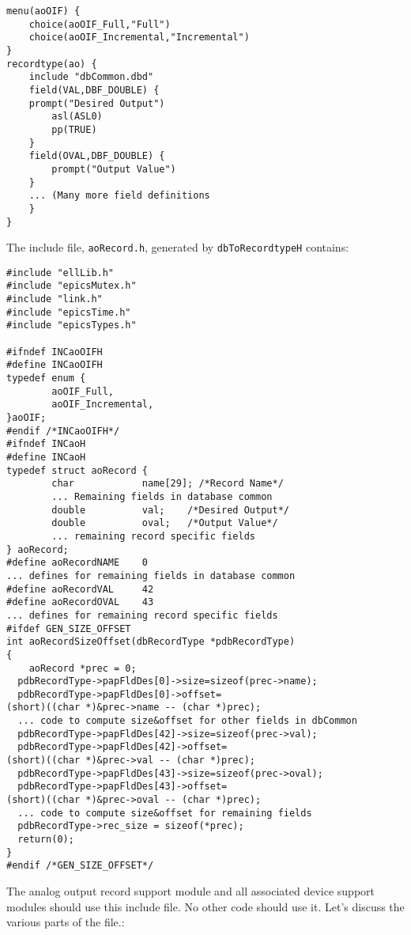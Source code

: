 \begin{verbatim}
menu(aoOIF) {
    choice(aoOIF_Full,"Full")
    choice(aoOIF_Incremental,"Incremental")
}
recordtype(ao) {
    include "dbCommon.dbd"
    field(VAL,DBF_DOUBLE) {
    prompt("Desired Output")
        asl(ASL0)
        pp(TRUE)
    }
    field(OVAL,DBF_DOUBLE) {
        prompt("Output Value")
    }
    ... (Many more field definitions
    }
}
\end{verbatim}

The include file, \verb|aoRecord.h|, generated by \verb|dbToRecordtypeH| contains:

\begin{verbatim}
#include "ellLib.h"
#include "epicsMutex.h"
#include "link.h"
#include "epicsTime.h"
#include "epicsTypes.h"

#ifndef INCaoOIFH
#define INCaoOIFH
typedef enum {
        aoOIF_Full,
        aoOIF_Incremental,
}aoOIF;
#endif /*INCaoOIFH*/
#ifndef INCaoH
#define INCaoH
typedef struct aoRecord {
        char            name[29]; /*Record Name*/
        ... Remaining fields in database common
        double          val;    /*Desired Output*/
        double          oval;   /*Output Value*/
        ... remaining record specific fields
} aoRecord;
#define aoRecordNAME    0
... defines for remaining fields in database common
#define aoRecordVAL     42
#define aoRecordOVAL    43
... defines for remaining record specific fields
#ifdef GEN_SIZE_OFFSET
int aoRecordSizeOffset(dbRecordType *pdbRecordType)
{
    aoRecord *prec = 0;
  pdbRecordType->papFldDes[0]->size=sizeof(prec->name);
  pdbRecordType->papFldDes[0]->offset=
(short)((char *)&prec->name -- (char *)prec);
  ... code to compute size&offset for other fields in dbCommon
  pdbRecordType->papFldDes[42]->size=sizeof(prec->val);
  pdbRecordType->papFldDes[42]->offset=
(short)((char *)&prec->val -- (char *)prec);
  pdbRecordType->papFldDes[43]->size=sizeof(prec->oval);
  pdbRecordType->papFldDes[43]->offset=
(short)((char *)&prec->oval -- (char *)prec);
  ... code to compute size&offset for remaining fields
  pdbRecordType->rec_size = sizeof(*prec);
  return(0);
}
#endif /*GEN_SIZE_OFFSET*/

\end{verbatim}

The analog output record support module and all associated device support modules should use this include file.
No other code should use it.
Let's discuss the various parts of the file.:

